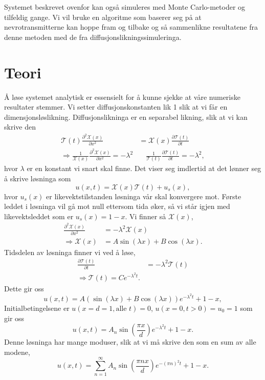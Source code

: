 \documentclass[norsk, 10pt]{article}
\def\para#1{\left( #1 \right)}
\begin{document}
Systemet beskrevet ovenfor kan også simuleres med Monte Carlo-metoder og tilfeldig gange. Vi vil bruke en algoritme som baserer seg på at nevrotransmitterne kan hoppe fram og tilbake og så sammenlikne resultatene fra denne metoden med de fra diffusjonslikningssimuleringa.

\section*{Teori}
Å løse systemet analytisk er essensielt for å kunne sjekke at våre numeriske resultater stemmer. Vi setter diffusjonskonstanten lik 1 slik at vi får en dimensjonsløslikning. Diffusjonslikninga er en separabel likning, slik at vi kan skrive den
\begin{align*}
\mathcal T(t) \frac{\partial^2\mathcal X(x)}{\partial x^2} &= \mathcal X(x) \frac{\partial \mathcal T(t)}{\partial t} \\
\Rightarrow \frac{1}{\mathcal X(x)} \frac{\partial^2\mathcal X(x)}{\partial x^2} = -\lambda^2 &\quad \frac{1}{\mathcal T(t)} \frac{\partial\mathcal T(t)}{\partial t} = -\lambda^2,
\end{align*}
hvor $\lambda$ er en konstant vi snart skal finne. Det viser seg imdlertid at det lønner seg å skrive løsninga som
$$ u(x,t) = \mathcal X(x)\mathcal T(t) + u_s(x), $$
hvor $u_s(x)$ er likevektstilstanden løsninga vår skal konvergere mot. Første leddet i løsninga vil gå mot null ettersom tida øker, så vi står igjen med likevektsleddet som er $u_s(x) = 1-x$. Vi finner så $\mathcal X(x)$,
\begin{align*}
 \frac{\partial^2\mathcal X(x)}{\partial x^2} &= -\lambda^2\mathcal X(x) \\
 \Rightarrow \mathcal X(x) &= A\sin(\lambda x) + B\cos(\lambda x).
\end{align*}
Tidsdelen av løsninga finner vi ved å løse,
\begin{align*}
 \frac{\partial\mathcal T(t)}{\partial t} &= -\lambda^2\mathcal T(t) \\
 \Rightarrow \mathcal T(t) = Ce^{-\lambda^2 t}.
\end{align*}
Dette gir oss
$$ u(x,t) = A\para{\sin\para{\lambda x} + B\cos(\lambda x)}e^{-\lambda^2 t} + 1 - x, $$
Initialbetingelsene er $u(x=d=1,\text{alle } t) = 0$, $u(x=0,t > 0) = u_0 = 1$ som gir oss
$$ u(x,t) = A_n\sin\para{\frac{\pi x}{d}}e^{-\lambda^2 t} + 1 - x. $$
Denne løsninga har mange moduser, slik at vi må skrive den som en sum av alle modene,
$$ u(x,t) = \sum\limits_{n=1}^{\infty}A_n\sin\para{\frac{\pi nx}{d}}e^{-(\pi n)^2 t} + 1 - x.$$
\end{document}
